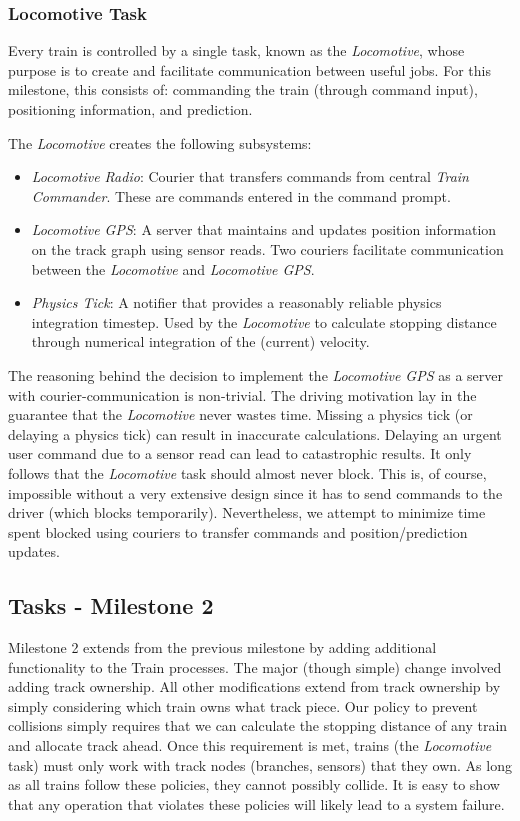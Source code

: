 \documentclass[twoside,a4paper]{refart}
\begin{document}
\subsubsection{Locomotive Task}
Every train is controlled by a single task, known as the \textit{Locomotive}, whose purpose is to create and facilitate communication between useful jobs. For this milestone, this consists of: commanding the train (through command input), positioning information, and prediction.

The \textit{Locomotive} creates the following subsystems:
\begin{itemize}
    \item{ \textit{Locomotive Radio}: Courier that transfers commands from central \textit{Train Commander}. These are commands entered in the command prompt.}
    \item{ \textit{Locomotive GPS}: A server that maintains and updates position information on the track graph using sensor reads. Two couriers facilitate communication between the \textit{Locomotive} and \textit{Locomotive GPS}. }
    \item{ \textit{Physics Tick}: A notifier that provides a reasonably reliable physics integration timestep. Used by the \textit{Locomotive} to calculate stopping distance through numerical integration of the (current) velocity. }
\end{itemize}

The reasoning behind the decision to implement the \textit{Locomotive GPS} as a server with courier-communication is non-trivial. The driving motivation lay in the guarantee that the \textit{Locomotive} never wastes time. Missing a physics tick (or delaying a physics tick) can result in inaccurate calculations. Delaying an urgent user command due to a sensor read can lead to catastrophic results. It only follows that the \textit{Locomotive} task should almost never block. This is, of course, impossible without a very extensive design since it has to send commands to the driver (which blocks temporarily). Nevertheless, we attempt to minimize time spent blocked using couriers to transfer commands and position/prediction updates.

\subsection{Tasks - Milestone 2}
Milestone 2 extends from the previous milestone by adding additional functionality to the Train processes. The major (though simple) change involved adding track ownership. All other modifications extend from track ownership by simply considering which train owns what track piece. Our policy to prevent collisions simply requires that we can calculate the stopping distance of any train and allocate track ahead. Once this requirement is met, trains (the \textit{Locomotive} task) must only work with track nodes (branches, sensors) that they own. As long as all trains follow these policies, they cannot possibly collide. It is easy to show that any operation that violates these policies will likely lead to a system failure.
\end{document}
